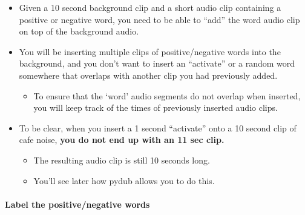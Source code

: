 \documentclass[11pt]{article}
\begin{document}
\begin{itemize}
\itemsep1pt\parskip0pt
\item
  Given a 10 second background clip and a short audio clip containing a
  positive or negative word, you need to be able to ``add'' the word
  audio clip on top of the background audio.
\item
  You will be inserting multiple clips of positive/negative words into
  the background, and you don't want to insert an ``activate'' or a
  random word somewhere that overlaps with another clip you had
  previously added.

  \begin{itemize}
  \itemsep1pt\parskip0pt
  \item
    To ensure that the `word' audio segments do not overlap when
    inserted, you will keep track of the times of previously inserted
    audio clips.
  \end{itemize}
\item
  To be clear, when you insert a 1 second ``activate'' onto a 10 second
  clip of cafe noise, \textbf{you do not end up with an 11 sec clip.}

  \begin{itemize}
  \itemsep1pt\parskip0pt
  \item
    The resulting audio clip is still 10 seconds long.
  \item
    You'll see later how pydub allows you to do this.
  \end{itemize}
\end{itemize}

    \paragraph{Label the positive/negative
words}\label{label-the-positivenegative-words}
\end{document}
